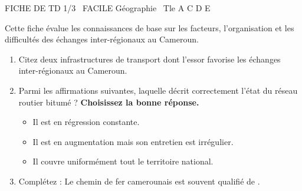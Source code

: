 \documentclass[11pt]{article}
\begin{document}
\begin{tcolorbox}[enhanced,colback=popink,colframe=popink,arc=10pt,boxrule=0pt,left=12pt,right=12pt,top=9pt,bottom=9pt]
{\color{white}\popxbold\small FICHE DE TD 1/3 \textbullet\ FACILE \hfill Géographie \textbullet\ Tle A C D E\par}
\end{tcolorbox}
\vspace{4pt}
Cette fiche évalue les connaissances de base sur les facteurs, l'organisation et les difficultés des échanges inter-régionaux au Cameroun.

\begin{exercice}
\begin{enumerate}
    \item Citez deux infrastructures de transport dont l'essor favorise les échanges inter-régionaux au Cameroun.
    \item Parmi les affirmations suivantes, laquelle décrit correctement l'état du réseau routier bitumé ? \textbf{Choisissez la bonne réponse.}
    \begin{itemize}
        \item[A.] Il est en régression constante.
        \item[B.] Il est en augmentation mais son entretien est irrégulier.
        \item[C.] Il couvre uniformément tout le territoire national.
    \end{itemize}
    \item Complétez : Le chemin de fer camerounais est souvent qualifié de \underline{\hspace{4cm}}.
\end{enumerate}
\end{exercice}
\end{document}
